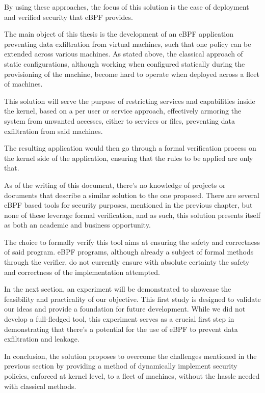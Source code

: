 By using these approaches, the focus of this solution is the ease of deployment and verified security that eBPF provides. 

The main object of this thesis is the development of an eBPF application preventing data exfiltration from virtual machines, such that one policy can be extended across various machines. As stated above, the classical approach of static configurations, although working when configured statically during the provisioning of the machine, become hard to operate when deployed across a fleet of machines. 

This solution will serve the purpose of restricting services and capabilities inside the kernel, based on a per user or service approach, effectively armoring the system from unwanted accesses, either to services or files, preventing data exfiltration from said machines.

The resulting application would then go through a formal verification process on the kernel side of the application, ensuring that the rules to be applied are only that. 

As of the writing of this document, there's no knowledge of projects or documents that describe a similar solution to the one proposed. There are several eBPF based tools for security purposes, mentioned in the previous chapter, but none of these leverage formal verification, and as such, this solution presents itself as both an academic and business opportunity.

The choice to formally verify this tool aims at ensuring the safety and correctness of said program. eBPF programs, although already a subject of formal methods through the verifier, do not currently ensure with absolute certainty the safety and correctness of the implementation attempted. 

In the next section, an experiment will be demonstrated to showcase the feasibility and practicality of our objective. This first study is designed to validate our ideas and provide a foundation for future development. While we did not develop a full-fledged tool, this experiment serves as a crucial first step in demonstrating that there's a potential for the use of eBPF to prevent data exfiltration and leakage. 

In conclusion, the solution proposes to overcome the challenges mentioned in the previous section by providing a method of dynamically implement security policies, enforced at kernel level, to a fleet of machines, without the hassle needed with classical methods.


